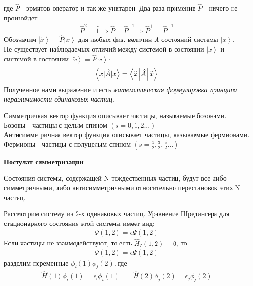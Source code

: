 \documentclass[__main__.tex]{subfiles}
\begin{document}
где $\hat{P}$ - эрмитов оператор и так же унитарен. Два раза применив $\hat{P}$ - ничего не произойдет.\\
\begin{gather}
    \hat{P}^2 = \hat{1} \Longrightarrow \hat{P} = \hat{P}^{-1} \Longrightarrow \hat{P}^+ = \hat{P}^{-1}
\end{gather}
Обозначим $\left| \widetilde{x} \right> = \hat{P}\left| x \right>$ для любых физ. величин $A$ состояний системы $\left| x \right>$.\\
Не существует наблюдаемых отличий между системой в состоянии $\left| x \right>$ и системой в состоянии $\left| \widetilde{x} \right> = \hat{P}\left| x \right>$:
\begin{gather}
    \llabel{ch02:1}
    \left< x|\hat{A}|x \right> = \left< \widetilde{x}\left| \hat{A} \right|\widetilde{x} \right>
\end{gather}
Полученное нами выражение  и есть \textit{математическая формулировка принципа неразличимости одинаковых частиц}.
\begin{definition}
    Симметричная вектор функция описывает частицы, называемые бозонами.\\
    Бозоны - частицы с целым спином $(s = 0,1,2...)$\\
    Антисимметричная вектор функция описывает частицы, называемые фермионами.\\
    Фермионы - частицы с полуцелым спином $(s = \frac{1}{2},\frac{3}{2},\frac{5}{2}...)$\\
\end{definition}
\textbf{Постулат симметризации}
\begin{definition}
    Состояния системы, содержащей N тождественных частиц, будут все либо симметричными, либо антисимметричными относительно перестановок этих N частиц.\\
\end{definition}
Рассмотрим систему из 2-х одинаковых частиц. Уравнение Шредингера для стационарного состояния этой системы имеет вид:\\
\begin{gather}
    [\hat{H}(1)+\hat{H}(2)+\hat{H}_I(1,2)]\Psi(1,2) = \epsilon \Psi(1,2)
\end{gather}
Если частицы не взаимодействуют, то есть $\hat{H}_I(1,2) = 0$, то
\begin{gather}
    [\hat{H}(1)+\hat{H}(2)]\Psi(1,2) = \epsilon \Psi(1,2)
\end{gather}
разделим переменные $\phi_i(1)\phi_j(2)$, где
\begin{gather}
    \hat{H}(1)\phi_i(1)=\epsilon_i\phi_i(1) \qquad \hat{H}(2)\phi_j(2)=\epsilon_j\phi_j(2)
\end{gather}
\end{document}
